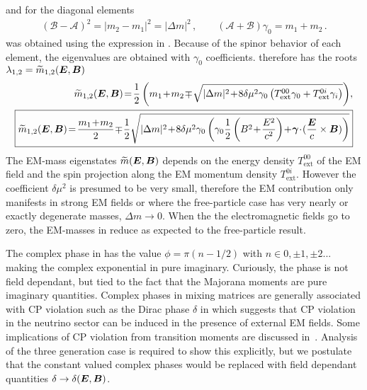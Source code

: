 and for the diagonal elements
\begin{align}
(\mathcal{B}-\mathcal{A})^{2} = |m_{2}-m_{1}|^{2} = |\Delta m|^{2}\,,\qquad (\mathcal{A}+\mathcal{B})\gamma_{0} = m_{1} + m_{2}\,.
\end{align}
 was obtained using the expression in . Because of the spinor behavior of each element, the eigenvalues are obtained with $\gamma_{0}$ coefficients.  therefore has the roots $\lambda_{1,2} = \widetilde m_{1,2}(\boldsymbol{E},\boldsymbol{B})$
\begin{align}
\label{poly:2}
\widetilde m_{1,2}(\bb{E},\bb{B})\! =\! \frac{1}{2}\left(m_{1}\!+\!m_{2}\!\mp\!\sqrt{|\Delta m|^{2}\!+\!8\delta\mu^{2}\gamma_{0}\left(T_\mathrm{ext}^{00}\gamma_{0}+T_\mathrm{ext}^{0i}\gamma_{i}\right)}\right)\!,\\
\label{poly:3}
\boxed{\widetilde m_{1,2}(\bb{E},\bb{B})\! =\! \frac{m_{1}\!+\!m_{2}}{2}\!\mp\!\frac{1}{2}\sqrt{|\Delta m|^{2}\!+\!8\delta\mu^{2}\gamma_{0}\left(\gamma_{0}\frac{1}{2}\left(B^{2}\!+\!\frac{E^{2}}{c^{2}}\right)\!+\!\bb{\gamma}\!\cdot\!(\frac{\bb{E}}{c}\times\bb{B})\right)}}
\end{align}
The EM-mass eigenstates $\widetilde m(\boldsymbol{E},\boldsymbol{B})$ depends on the energy density $T_\mathrm{ext}^{00}$ of the EM field and the spin projection along the EM momentum density $T_\mathrm{ext}^{0i}$. However the coefficient $\delta\mu^{2}$ is presumed to be very small, therefore the EM contribution only manifests in strong EM fields or where the free-particle case has very nearly or exactly degenerate masses, $\Delta m\to 0$. When the the electromagnetic fields go to zero, the EM-masses in  reduce as expected to the free-particle result.

The complex phase in  has the value $\phi=\pi(n-1/2)$ with $n\in0,\pm1,\pm2...$ making the complex exponential in  pure imaginary. Curiously, the phase is not field dependant, but tied to the fact that the Majorana moments are pure imaginary quantities. Complex phases in mixing matrices are generally associated with CP violation such as the Dirac phase $\delta$ in  which suggests that CP violation in the neutrino sector can be induced in the presence of external EM fields. Some implications of CP violation from transition moments are discussed in~\cite{Nieves:1981zt}. Analysis of the three generation case is required to show this explicitly, but we postulate that the constant valued complex phases would be replaced with field dependant quantities $\delta\to\delta(\boldsymbol{E},\boldsymbol{B})$.

